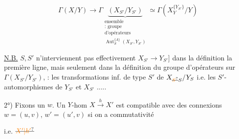 \[
\Gamma(X/Y)\longrightarrow
\Gamma\underbrace{(X_{S'}/Y_{S'})}_{\substack{\text{ensemble}\\
\text{: groupe}\\ \text{d'opérateurs}\\
\operatorname{Aut}^{\{\Lambda\}}_{S}(X_{S'},Y_{S'})}}
\simeq\Gamma(X_Y^{\{Y_{S'}\}}/Y)
\]

\uline{N.B.} $S,S'$ n'interviennent pas effectivement  \inserted{[\unsure{seult|seulement} par} $X_{S'}\to Y_{S'}$] dans la définition  la première ligne, mais seulement dans la définition du groupe d'opérateurs sur $\Gamma(X_{S'}/Y_{S'})$, : les transformations inf. de type $S'$ de $X_{\deleted{\unsure{S}}S}/Y_S$ i.e. les $S'$-automorphismes de $Y_{S'}$ et $X_{S'}$ .....

2°) Fixons un $w$. Un $Y$-hom $\displaystyle X\xrightarrow{h}X'$ est compatible avec des connexions $w=(u,v)$, $w'=(u',v)$ si on a commutativité 

\hfill i.e. $\deleted{\unsure{X'|h'}}$ 


